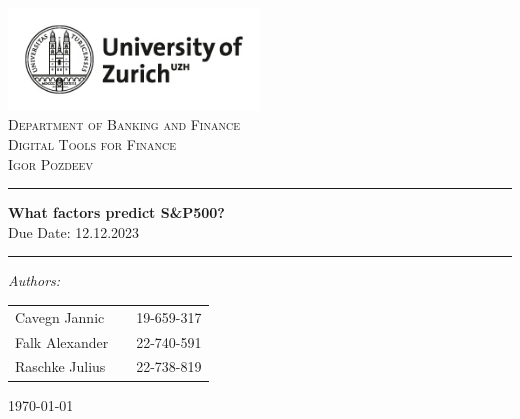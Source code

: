 \begin{titlepage}
\vbox{ }
\vbox{ }
\begin{center}
\includegraphics[width = 0.5\textwidth]{images/UZH_logo.png}\\
\vspace{0.5cm}
\textsc{\LARGE Department of Banking and Finance}\\
\vspace{1.5cm}
\textsc{\Large Digital Tools for Finance}\\
\vspace{0.2cm}
\textsc{\Large Igor Pozdeev}\\
\vspace{0.5cm}
\vbox{ }

\hrule
\vspace{0.4cm}
{ \huge \bfseries What factors predict S\&P500?}\\
{Due Date: 12.12.2023}
\vspace{0.4cm}
\hrule
\vspace{1.5cm}

\large
\emph{Authors:}\\
    \begin{table}[hb]
        \centering
        \begin{tabular}{lll}
            Cavegn Jannic   && 19-659-317 \\
            Falk Alexander && 22-740-591 \\
            Raschke Julius    && 22-738-819 \\
            \end{tabular}
    \end{table}
\vfill

{\large \today}
\end{center}
\end{titlepage}